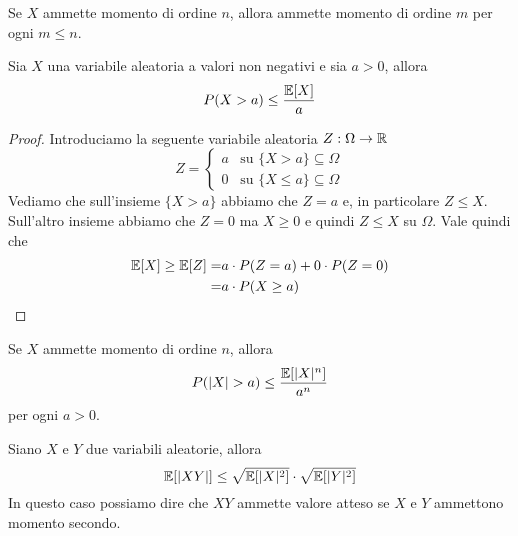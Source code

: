 \begin{proposition}
	Se $X$ ammette momento di ordine $n$, allora ammette momento di ordine $m$ per ogni $m \leq n$.
\end{proposition}

\begin{proposition}
	Sia $X$ una variabile aleatoria a valori non negativi e sia $a>0$, allora
	\[ P(X > a) \leq \frac{\mathbb{E}[X]}{a} \]
	\begin{proof}
		Introduciamo la seguente variabile aleatoria $Z : \Omega \to \mathbb{R}$
		\[
			Z = \begin{cases}
				a & \text{su } \{ X > a \} \subseteq \Omega    \\
				0 & \text{su } \{ X \leq a \} \subseteq \Omega
			\end{cases}
		\]
		Vediamo che sull'insieme $\{ X > a \}$ abbiamo che $Z = a$ e, in particolare $Z \leq X$.
		Sull'altro insieme abbiamo che $Z = 0$ ma $X \geq 0$ e quindi $Z \leq X$ su $\Omega$.
		Vale quindi che
		\begin{align*}
			\mathbb{E}[X] \geq \mathbb{E}[Z] = & a \cdot P(Z = a) + 0 \cdot P(Z = 0) \\
			=                  & a \cdot P(X \geq a)
		\end{align*}
	\end{proof}
\end{proposition}

\begin{corollary}
	Se $X$ ammette momento di ordine $n$, allora
	\[ P(|X| > a) \leq \frac{\mathbb{E}[|X|^n]}{a^n} \]
	per ogni $a > 0$.
\end{corollary}

\begin{proposition}
	Siano $X$ e $Y$ due variabili aleatorie, allora
	\[ \mathbb{E}[|XY|] \leq \sqrt{\mathbb{E}[|X|^2]} \cdot \sqrt{\mathbb{E}[|Y|^2]} \]
	In questo caso possiamo dire che $XY$ ammette valore atteso se $X$ e $Y$ ammettono momento
	secondo.
\end{proposition}
